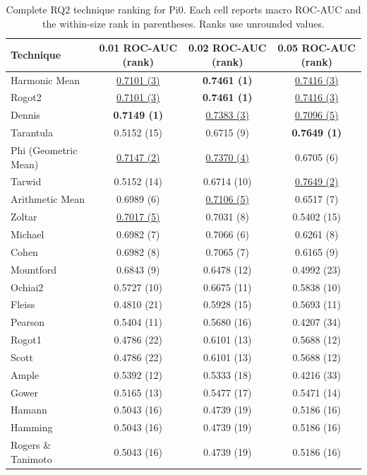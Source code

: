 \begin{table}[t]
\centering
\caption{Complete RQ2 technique ranking for Pi0. Each cell reports macro ROC-AUC and the within-size rank in parentheses. Ranks use unrounded values.}
\label{tab:rq2-supplementary-pi0}
{\scriptsize
\setlength{\tabcolsep}{7pt}
\renewcommand{\arraystretch}{0.96}
\begin{tabular}{lccc}
\toprule
Technique & 0.01 ROC-AUC (rank) & 0.02 ROC-AUC (rank) & 0.05 ROC-AUC (rank) \\
\midrule
Harmonic Mean & \underline{0.7101 (3)} & \textbf{0.7461 (1)} & \underline{0.7416 (3)} \\
Rogot2 & \underline{0.7101 (3)} & \textbf{0.7461 (1)} & \underline{0.7416 (3)} \\
Dennis & \textbf{0.7149 (1)} & \underline{0.7383 (3)} & \underline{0.7096 (5)} \\
Tarantula & 0.5152 (15) & 0.6715 (9) & \textbf{0.7649 (1)} \\
Phi (Geometric Mean) & \underline{0.7147 (2)} & \underline{0.7370 (4)} & 0.6705 (6) \\
Tarwid & 0.5152 (14) & 0.6714 (10) & \underline{0.7649 (2)} \\
Arithmetic Mean & 0.6989 (6) & \underline{0.7106 (5)} & 0.6517 (7) \\
Zoltar & \underline{0.7017 (5)} & 0.7031 (8) & 0.5402 (15) \\
Michael & 0.6982 (7) & 0.7066 (6) & 0.6261 (8) \\
Cohen & 0.6982 (8) & 0.7065 (7) & 0.6165 (9) \\
Mountford & 0.6843 (9) & 0.6478 (12) & 0.4992 (23) \\
Ochiai2 & 0.5727 (10) & 0.6675 (11) & 0.5838 (10) \\
Fleiss & 0.4810 (21) & 0.5928 (15) & 0.5693 (11) \\
Pearson & 0.5404 (11) & 0.5680 (16) & 0.4207 (34) \\
Rogot1 & 0.4786 (22) & 0.6101 (13) & 0.5688 (12) \\
Scott & 0.4786 (22) & 0.6101 (13) & 0.5688 (12) \\
Ample & 0.5392 (12) & 0.5333 (18) & 0.4216 (33) \\
Gower & 0.5165 (13) & 0.5477 (17) & 0.5471 (14) \\
Hamann & 0.5043 (16) & 0.4739 (19) & 0.5186 (16) \\
Hamming & 0.5043 (16) & 0.4739 (19) & 0.5186 (16) \\
Rogers \& Tanimoto & 0.5043 (16) & 0.4739 (19) & 0.5186 (16) \\

\end{tabular}}
\end{table}
